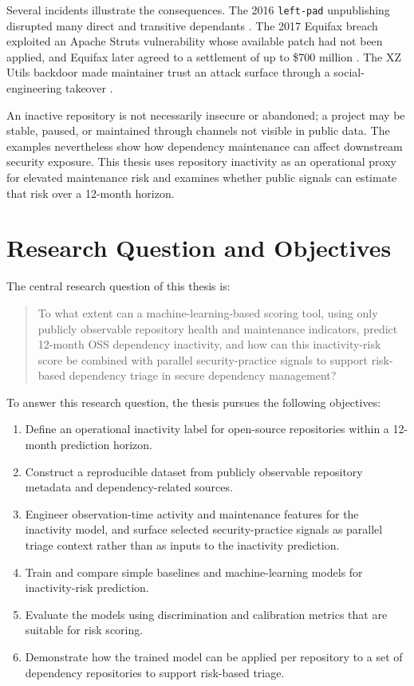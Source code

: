 Several incidents illustrate the consequences. The 2016 \texttt{left-pad}
unpublishing disrupted many direct and transitive dependants
\cite{npm2016leftpad}. The 2017 Equifax breach exploited an Apache Struts
vulnerability whose available patch had not been applied, and Equifax later
agreed to a settlement of up to
\$700 million \cite{equifax2017incident,ftc2019equifax}. The XZ Utils backdoor
made maintainer trust an attack surface through a social-engineering takeover
\cite{openssf2024xzalert}.

An inactive repository is not necessarily insecure or abandoned; a project may
be stable, paused, or maintained through channels not visible in public data.
The examples nevertheless show how dependency maintenance can affect downstream
security exposure. This thesis uses repository inactivity as an operational
proxy for elevated maintenance risk and examines whether public signals can
estimate that risk over a 12-month horizon.

\section{Research Question and Objectives}
\label{sec:intro-research-question}

The central research question of this thesis is:

\begin{quote}
To what extent can a machine-learning-based scoring tool, using only publicly observable repository health and maintenance indicators, predict 12-month OSS dependency inactivity, and how can this inactivity-risk score be combined with parallel security-practice signals to support risk-based dependency triage in secure dependency management?
\end{quote}

To answer this research question, the thesis pursues the following objectives:

\begin{enumerate}
    \item Define an operational inactivity label for open-source repositories within a 12-month prediction horizon.
    \item Construct a reproducible dataset from publicly observable repository metadata and dependency-related sources.
    \item Engineer observation-time activity and maintenance features for the inactivity model, and surface selected security-practice signals as parallel triage context rather than as inputs to the inactivity prediction.
    \item Train and compare simple baselines and machine-learning models for inactivity-risk prediction.
    \item Evaluate the models using discrimination and calibration metrics that are suitable for risk scoring.
    \item Demonstrate how the trained model can be applied per repository to a set of dependency repositories to support risk-based triage.
\end{enumerate}


